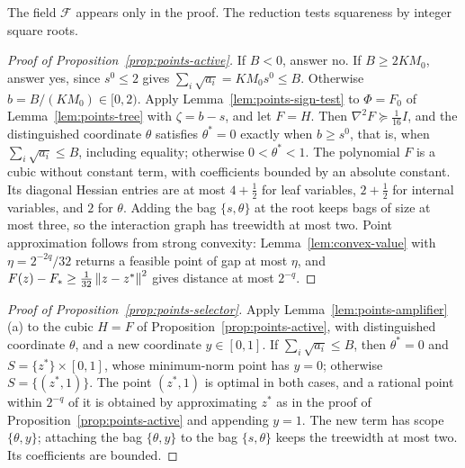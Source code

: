 The field $\mathcal F$ appears only in the proof. The reduction tests squareness by
integer square roots.

\begin{proof}[Proof of Proposition~\ref{prop:points-active}]
If $B<0$, answer no. If $B\ge2KM_0$, answer yes, since $s^0\le2$ gives
$\sum_i\sqrt{a_i}=KM_0s^0\le B$. Otherwise $b=B/(KM_0)\in[0,2)$. Apply
Lemma~\ref{lem:points-sign-test} to $\Phi=F_0$ of Lemma~\ref{lem:points-tree}
with $\zeta=b-s$, and let $F=H$. Then $\nabla^2F\succeq\frac1{16}I$, and the
distinguished coordinate $\theta$ satisfies $\theta^*=0$ exactly when
$b\ge s^0$, that is, when $\sum_i\sqrt{a_i}\le B$, including equality;
otherwise $0<\theta^*<1$. The polynomial $F$ is a cubic without constant
term, with coefficients bounded by an absolute constant. Its diagonal
Hessian entries are at most $4+\frac12$ for leaf variables, $2+\frac12$ for
internal variables, and $2$ for $\theta$. Adding the bag $\{s,\theta\}$ at
the root keeps bags of size at most three, so the interaction graph has
treewidth at most two. Point approximation follows from strong convexity:
Lemma~\ref{lem:convex-value} with $\eta=2^{-2q}/32$ returns a feasible point
of gap at most $\eta$, and $F(z)-F_*\ge\frac1{32}\left\lVert z-z^*\right\rVert^2$ gives
distance at most $2^{-q}$.
\end{proof}

\begin{proof}[Proof of Proposition~\ref{prop:points-selector}]
Apply Lemma~\ref{lem:points-amplifier}(a) to the cubic $H=F$ of
Proposition~\ref{prop:points-active}, with distinguished coordinate
$\theta$, and a new coordinate $y\in[0,1]$. If $\sum_i\sqrt{a_i}\le B$, then
$\theta^*=0$ and $S=\{z^*\}\times[0,1]$, whose minimum-norm point has $y=0$;
otherwise $S=\{(z^*,1)\}$. The point $(z^*,1)$ is optimal in both cases, and
a rational point within $2^{-q}$ of it is obtained by approximating $z^*$ as
in the proof of Proposition~\ref{prop:points-active} and appending $y=1$.
The new term has scope $\{\theta,y\}$; attaching the bag $\{\theta,y\}$ to
the bag $\{s,\theta\}$ keeps the treewidth at most two. Its coefficients are
bounded.
\end{proof}

